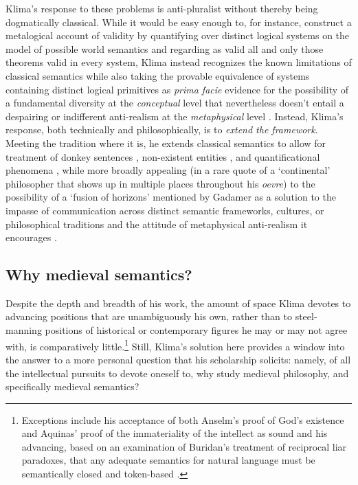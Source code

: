 \documentclass[]{article}
\begin{document}
Klima's response to these problems is anti-pluralist 
without thereby being dogmatically classical. 
While it would be easy enough to, for instance, 
construct a metalogical account of validity by quantifying over distinct logical systems on the model of possible world semantics and regarding as valid all and only those theorems valid in every system, 
Klima instead recognizes the known limitations of classical semantics 
while also taking the provable equivalence of systems containing distinct logical primitives
as \emph{prima facie} evidence for the possibility of a fundamental diversity at the \emph{conceptual} level 
that nevertheless doesn't entail a despairing or indifferent anti-realism at the \emph{metaphysical} level \autocite{Klima2012}.
Instead, 
Klima's response, 
both technically and philosophically, 
is to \emph{extend the framework}. 
Meeting the tradition where it is, he extends classical semantics to allow for treatment of 
donkey sentences \autocite{Klima1988,Klima2010}, 
non-existent entities \autocite{Klima2001}, 
and quantificational phenomena \autocite{KlimaSandu1990},
while more broadly appealing (in a rare quote of a `continental' philosopher that shows up in multiple places throughout his \emph{oevre}) 
to the possibility of a `fusion of horizons' mentioned by Gadamer 
as a solution to the impasse of communication across distinct semantic frameworks, cultures, or philosophical traditions 
and the attitude of metaphysical anti-realism it encourages \autocite{Klima2000,Klima2009a}.

\subsection{Why medieval semantics?}
Despite the depth and breadth of his work, 
the amount of space Klima devotes to advancing positions that are unambiguously his own, 
rather than to steel-manning positions of historical or contemporary figures 
he may or may not agree with,
is comparatively little.\footnote{Exceptions include his acceptance of both Anselm's proof of God's existence and Aquinas' proof of the immateriality of the intellect as sound \autocite{Klima2000,Klima2009a} 
	and his advancing, 
	based on an examination of Buridan's treatment of reciprocal liar paradoxes, 
	that any adequate semantics for natural language must be semantically closed and token-based \autocite{Klima2004,Klima2008}.} 
Still, 
Klima's solution here provides a window into the answer to a more personal question that his scholarship solicits: 
namely, 
of all the intellectual pursuits to devote oneself to, 
why study medieval philosophy, 
and specifically medieval semantics?
\end{document}
